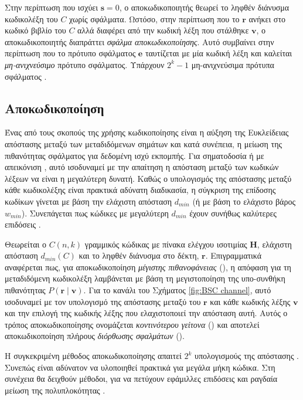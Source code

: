 Στην περίπτωση που ισχύει $\mathbf{s}=0$, ο αποκωδικοποιητής θεωρεί το ληφθέν διάνυσμα κωδικολέξη του $C$ χωρίς σφάλματα. Ωστόσο, στην περίπτωση που το $\mathbf{r}$ ανήκει στο κωδικό βιβλίο του $C$ αλλά διαφέρει από την κωδική λέξη που στάλθηκε $\mathbf{v}$, ο αποκωδικοποιητής διαπράττει \textit{σφάλμα αποκωδικοποίησης}. Αυτό συμβαίνει στην περίπτωση που το πρότυπο σφάλματος $\mathbf{e}$ ταυτίζεται με μία κωδική λέξη και καλείται \textit{μη-ανιχνεύσιμο} πρότυπο σφάλματος. Υπάρχουν $2^k-1$ μη-ανιχνεύσιμα πρότυπα σφάλματος \cite{macwilliams1977theory}.

\subsection{Αποκωδικοποίηση}

Ένας από τους σκοπούς της χρήσης κωδικοποίησης είναι η αύξηση της Ευκλείδειας απόστασης μεταξύ των μεταδιδόμενων σημάτων και κατά συνέπεια, η μείωση της πιθανότητας σφάλματος για δεδομένη ισχύ εκπομπής. Για σηματοδοσία  ή  με απεικόνιση , αυτό ισοδυναμεί με την απαίτηση η απόσταση  μεταξύ των κωδικών λέξεων να είναι η μεγαλύτερη δυνατή. Καθώς ο υπολογισμός της απόστασης  μεταξύ κάθε κωδικολέξης είναι πρακτικά αδύνατη διαδικασία, η σύγκριση της επίδοσης κωδίκων γίνεται με βάση την ελάχιστη απόσταση $d_{min}$ (ή με βάση το ελάχιστο βάρος $w_{min}$). Συνεπάγεται πως κώδικες με μεγαλύτερη $d_{min}$ έχουν συνήθως καλύτερες επιδόσεις \cite{proakis1994communication}.

Θεωρείται ο $C(n,k)$ γραμμικός  κώδικας με πίνακα ελέγχου ισοτιμίας $\mathbf{H}$, ελάχιστη απόσταση $d_{min}(C)$ και το ληφθέν διάνυσμα στο δέκτη, $\mathbf{r}$. Επιγραμματικά αναφέρεται πως, για αποκωδικοποίηση \textit{μέγιστης πιθανοφάνειας} (), η απόφαση για τη μεταδιδόμενη κωδικολέξη λαμβάνεται με βάση τη μεγιστοποίηση της υπο-συνθήκη πιθανότητας $P(\mathbf{r}\mid\mathbf{v})$. Για το κανάλι  του Σχήματος \ref{fig:BSC channel}, αυτό ισοδυναμεί με τον υπολογισμό της απόστασης μεταξύ του $\mathbf{r}$ και κάθε κωδικής λέξης $\mathbf{v}$ και την επιλογή της κωδικής λέξης που ελαχιστοποιεί την απόσταση αυτή. Αυτός ο τρόπος αποκωδικοποίησης ονομάζεται \textit{κοντινότερου γείτονα} () και αποτελεί αποκωδικοποίηση πλήρους \textit{διόρθωσης σφαλμάτων} ().

Η συγκεκριμένη μέθοδος αποκωδικοποίησης απαιτεί $2^k$ υπολογισμούς της απόστασης . Συνεπώς είναι αδύνατον να υλοποιηθεί πρακτικά για μεγάλα μήκη κώδικα. Στη συνέχεια θα δειχθούν μέθοδοι, για να πετύχουν εφάμιλλες επιδόσεις και ραγδαία μείωση της πολυπλοκότητας \cite{ryan2009channel}.

